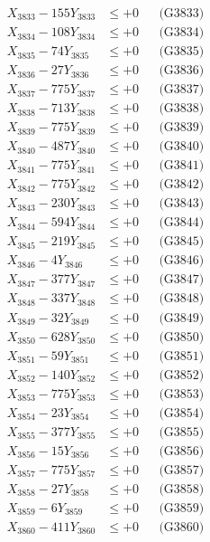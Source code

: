 \documentclass[a4paper,10pt]{article}
\begin{document}
{\begin{align}
X_{3833} - 155Y_{3833} &\leq +0 && \text{(G3833)} \\
X_{3834} - 108Y_{3834} &\leq +0 && \text{(G3834)} \\
X_{3835} - 74Y_{3835} &\leq +0 && \text{(G3835)} \\
X_{3836} - 27Y_{3836} &\leq +0 && \text{(G3836)} \\
X_{3837} - 775Y_{3837} &\leq +0 && \text{(G3837)} \\
X_{3838} - 713Y_{3838} &\leq +0 && \text{(G3838)} \\
X_{3839} - 775Y_{3839} &\leq +0 && \text{(G3839)} \\
X_{3840} - 487Y_{3840} &\leq +0 && \text{(G3840)} \\
\allowbreak
X_{3841} - 775Y_{3841} &\leq +0 && \text{(G3841)} \\
X_{3842} - 775Y_{3842} &\leq +0 && \text{(G3842)} \\
X_{3843} - 230Y_{3843} &\leq +0 && \text{(G3843)} \\
X_{3844} - 594Y_{3844} &\leq +0 && \text{(G3844)} \\
X_{3845} - 219Y_{3845} &\leq +0 && \text{(G3845)} \\
X_{3846} - 4Y_{3846} &\leq +0 && \text{(G3846)} \\
X_{3847} - 377Y_{3847} &\leq +0 && \text{(G3847)} \\
X_{3848} - 337Y_{3848} &\leq +0 && \text{(G3848)} \\
X_{3849} - 32Y_{3849} &\leq +0 && \text{(G3849)} \\
X_{3850} - 628Y_{3850} &\leq +0 && \text{(G3850)} \\
\allowbreak
X_{3851} - 59Y_{3851} &\leq +0 && \text{(G3851)} \\
X_{3852} - 140Y_{3852} &\leq +0 && \text{(G3852)} \\
X_{3853} - 775Y_{3853} &\leq +0 && \text{(G3853)} \\
X_{3854} - 23Y_{3854} &\leq +0 && \text{(G3854)} \\
X_{3855} - 377Y_{3855} &\leq +0 && \text{(G3855)} \\
X_{3856} - 15Y_{3856} &\leq +0 && \text{(G3856)} \\
X_{3857} - 775Y_{3857} &\leq +0 && \text{(G3857)} \\
X_{3858} - 27Y_{3858} &\leq +0 && \text{(G3858)} \\
X_{3859} - 6Y_{3859} &\leq +0 && \text{(G3859)} \\
X_{3860} - 411Y_{3860} &\leq +0 && \text{(G3860)} \\

\end{align}}
\end{document}
